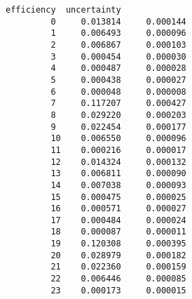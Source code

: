 \documentclass[11pt]{article}
\begin{document}
\begin{Verbatim}[commandchars=\\\{\}]
             efficiency  uncertainty  
         0     0.013814     0.000144  
         1     0.006493     0.000096  
         2     0.006867     0.000103  
         3     0.000454     0.000030  
         4     0.000487     0.000028  
         5     0.000438     0.000027  
         6     0.000048     0.000008  
         7     0.117207     0.000427  
         8     0.029220     0.000203  
         9     0.022454     0.000177  
         10    0.006550     0.000096  
         11    0.000216     0.000017  
         12    0.014324     0.000132  
         13    0.006811     0.000090  
         14    0.007038     0.000093  
         15    0.000475     0.000025  
         16    0.000571     0.000027  
         17    0.000484     0.000024  
         18    0.000087     0.000011  
         19    0.120308     0.000395  
         20    0.028979     0.000182  
         21    0.022360     0.000159  
         22    0.006446     0.000085  
         23    0.000173     0.000015  
\end{Verbatim}
            
\end{document}
